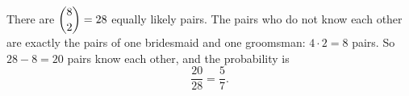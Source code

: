 There are $\dbinom82=28$ equally likely pairs. The pairs who do not know each other are exactly the pairs of one bridesmaid and one groomsman: $4\cdot2=8$ pairs. So $28-8=20$ pairs know each other, and the probability is
\[\dfrac{20}{28}=\boxed{\dfrac57}.\]
